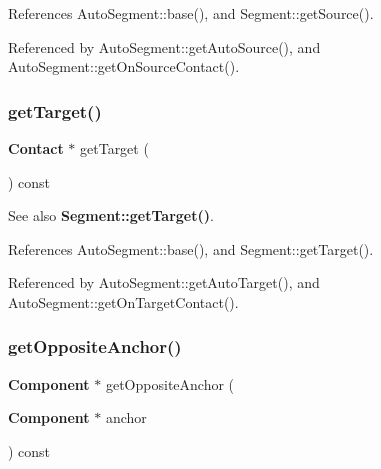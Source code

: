 References Auto\+Segment\+::base(), and Segment\+::get\+Source().



Referenced by Auto\+Segment\+::get\+Auto\+Source(), and Auto\+Segment\+::get\+On\+Source\+Contact().

\mbox{\label{classKatabatic_1_1AutoSegment_a0862c201bd7d8e5427e44ca2427c2fe6}} 
\subsubsection{\texorpdfstring{get\+Target()}{getTarget()}}
{\footnotesize\ttfamily \textbf{ Contact} $\ast$ get\+Target (\begin{DoxyParamCaption}{ }\end{DoxyParamCaption}) const\hspace{0.3cm}{\ttfamily [inline]}}

\begin{DoxySeeAlso}{See also}
\textbf{ Segment\+::get\+Target()}. 
\end{DoxySeeAlso}


References Auto\+Segment\+::base(), and Segment\+::get\+Target().



Referenced by Auto\+Segment\+::get\+Auto\+Target(), and Auto\+Segment\+::get\+On\+Target\+Contact().

\mbox{\label{classKatabatic_1_1AutoSegment_a9216d4467c2d4e0c7b9d9a8b8e798bee}} 
\subsubsection{\texorpdfstring{get\+Opposite\+Anchor()}{getOppositeAnchor()}\hspace{0.1cm}{\footnotesize\ttfamily [1/2]}}
{\footnotesize\ttfamily \textbf{ Component} $\ast$ get\+Opposite\+Anchor (\begin{DoxyParamCaption}\item[{\textbf{ Component} $\ast$}]{anchor }\end{DoxyParamCaption}) const\hspace{0.3cm}{\ttfamily [inline]}}

